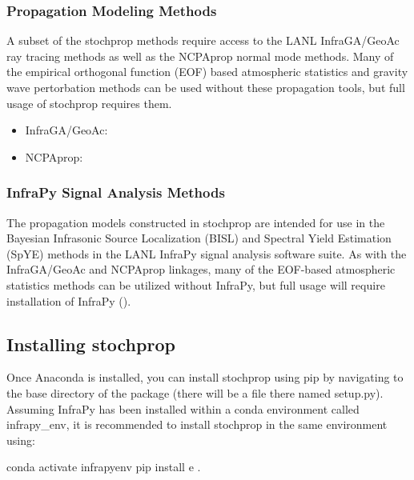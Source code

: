 \documentclass[letterpaper,10pt,english]{sphinxmanual}
\begin{document}
\subsubsection{Propagation Modeling Methods}
\label{\detokenize{installation:propagation-modeling-methods}}
A subset of the stochprop methods require access to the  LANL InfraGA/GeoAc ray tracing methods as well as the NCPAprop normal mode methods.  Many of the
empirical orthogonal function (EOF) based atmospheric statistics and gravity wave pertorbation methods can be used without these propagation tools, but full usage of stochprop requires them.
\begin{itemize}
\item {} 
InfraGA/GeoAc: 

\item {} 
NCPAprop: 

\end{itemize}


\subsubsection{InfraPy Signal Analysis Methods}
\label{\detokenize{installation:infrapy-signal-analysis-methods}}
The propagation models constructed in stochprop are intended for use in the Bayesian Infrasonic Source Localization (BISL) and Spectral Yield Estimation (SpYE)
methods in the LANL InfraPy signal analysis software suite.  As with the InfraGA/GeoAc and NCPAprop linkages, many of the EOF-based atmospheric statistics methods
can be utilized without InfraPy, but full usage will require installation of InfraPy ().


\subsection{Installing stochprop}
\label{\detokenize{installation:installing-stochprop}}
Once Anaconda is installed, you can install stochprop using pip by navigating to the base directory of the package (there will be a file there
named setup.py).  Assuming InfraPy has been installed within a conda environment called infrapy\_env, it is recommended to install stochprop in the same environment using:

\begin{sphinxVerbatim}[commandchars=\\\{\}]
\PYGZgt{}\PYGZgt{} conda activate infrapy\PYGZus{}env
\PYGZgt{}\PYGZgt{} pip install \PYGZhy{}e .
\end{sphinxVerbatim}
\end{document}
